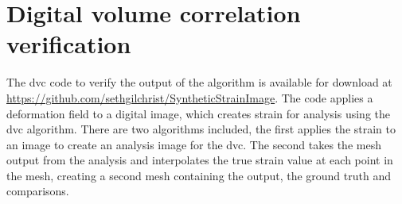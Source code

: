 \section{Digital volume correlation verification}
\label{sec:code_synthetic}
The \acf{dvc} code to verify the output of the algorithm is available for download at \url{https://github.com/sethgilchrist/SyntheticStrainImage}.
The code applies a deformation field to a digital image, which creates strain for analysis using the \ac{dvc} algorithm.
There are two algorithms included, the first applies the strain to an image to create an analysis image for the \ac{dvc}.
The second takes the mesh output from the analysis and interpolates the true strain value at each point in the mesh, creating a second mesh containing the output, the ground truth and comparisons.